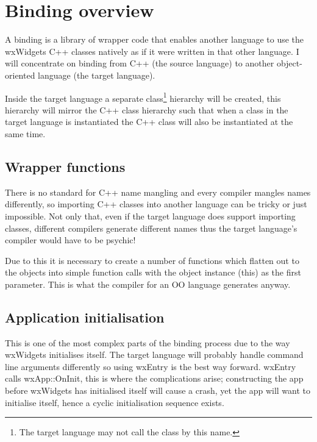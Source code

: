 \section{Binding overview}\label{bindingoverview}



A binding is a library of wrapper code that enables another language to use the wxWidgets C++ classes natively as if it were written
in that other language. I will concentrate on binding from C++ (the source language) to another object-oriented language (the target
language).

Inside the target language a separate class\footnote{The target language may not call the class by this name.} hierarchy will be
created, this hierarchy will mirror the C++ class hierarchy such that when a class in the target language is instantiated the C++
class will also be instantiated at the same time.

\subsection{Wrapper functions}\label{wrapperfunctions}

There is no standard for C++ name mangling and every compiler mangles names differently, so importing C++ classes into another language
can be tricky or just impossible. Not only that, even if the target language does support importing classes, different compilers generate
different names thus the target language's compiler would have to be psychic!

Due to this it is necessary to create a number of functions which flatten out to the objects into simple function calls with the object
instance (this) as the first parameter. This is what the compiler for an OO language generates anyway.

\subsection{Application initialisation}\label{applicationinitialisation}

This is one of the most complex parts of the binding process due to the way wxWidgets initialises itself. The target language will
probably handle command line arguments differently so using wxEntry is the best way forward. wxEntry calls wxApp::OnInit, this is
where the complications arise; constructing the app before wxWidgets has initialised itself will cause a crash, yet the app will want
to initialise itself, hence a cyclic initialisation sequence exists.


